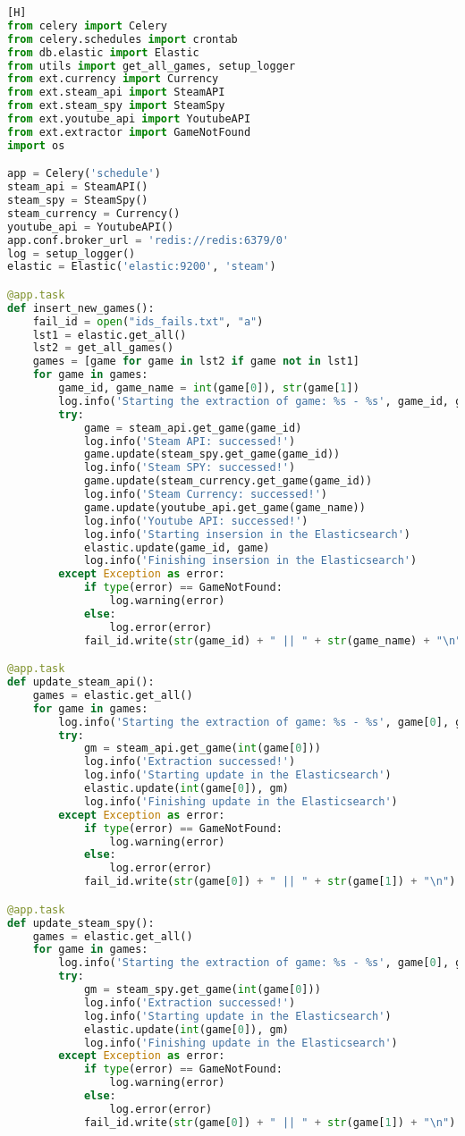 \begin{lstlisting}[language={Python}, caption = {Código do \textit{\textbf{Schedule}}}, label = {code:schedule}] [H]
from celery import Celery
from celery.schedules import crontab
from db.elastic import Elastic
from utils import get_all_games, setup_logger
from ext.currency import Currency
from ext.steam_api import SteamAPI
from ext.steam_spy import SteamSpy
from ext.youtube_api import YoutubeAPI
from ext.extractor import GameNotFound
import os

app = Celery('schedule')
steam_api = SteamAPI()
steam_spy = SteamSpy()
steam_currency = Currency()
youtube_api = YoutubeAPI()
app.conf.broker_url = 'redis://redis:6379/0'
log = setup_logger()
elastic = Elastic('elastic:9200', 'steam')

@app.task
def insert_new_games():
	fail_id = open("ids_fails.txt", "a")
	lst1 = elastic.get_all()
	lst2 = get_all_games()
	games = [game for game in lst2 if game not in lst1]
	for game in games:
		game_id, game_name = int(game[0]), str(game[1])
		log.info('Starting the extraction of game: %s - %s', game_id, game_name)
		try:
			game = steam_api.get_game(game_id)
			log.info('Steam API: successed!')
			game.update(steam_spy.get_game(game_id))
			log.info('Steam SPY: successed!')
			game.update(steam_currency.get_game(game_id))
			log.info('Steam Currency: successed!')
			game.update(youtube_api.get_game(game_name))
			log.info('Youtube API: successed!')
			log.info('Starting insersion in the Elasticsearch')
			elastic.update(game_id, game)
			log.info('Finishing insersion in the Elasticsearch')
		except Exception as error:
			if type(error) == GameNotFound:
				log.warning(error)
			else:
				log.error(error)
			fail_id.write(str(game_id) + " || " + str(game_name) + "\n")

@app.task
def update_steam_api():
	games = elastic.get_all()
	for game in games:
		log.info('Starting the extraction of game: %s - %s', game[0], game[1])
		try:
			gm = steam_api.get_game(int(game[0]))
			log.info('Extraction successed!')
			log.info('Starting update in the Elasticsearch')
			elastic.update(int(game[0]), gm)
			log.info('Finishing update in the Elasticsearch')
		except Exception as error:
			if type(error) == GameNotFound:
				log.warning(error)
			else:
				log.error(error)
			fail_id.write(str(game[0]) + " || " + str(game[1]) + "\n")

@app.task
def update_steam_spy():
	games = elastic.get_all()
	for game in games:
		log.info('Starting the extraction of game: %s - %s', game[0], game[1])
		try:
			gm = steam_spy.get_game(int(game[0]))
			log.info('Extraction successed!')
			log.info('Starting update in the Elasticsearch')
			elastic.update(int(game[0]), gm)
			log.info('Finishing update in the Elasticsearch')
		except Exception as error:
			if type(error) == GameNotFound:
				log.warning(error)
			else:
				log.error(error)
			fail_id.write(str(game[0]) + " || " + str(game[1]) + "\n")


\end{lstlisting}
